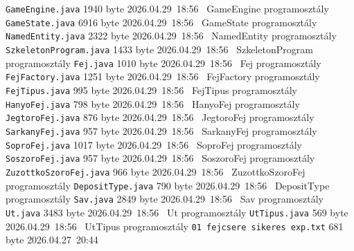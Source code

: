 \begin{fajllista}
    \fajl
    {\texttt{GameEngine.java}} %
    {1940 byte} %
    {2026.04.29~18:56~} %
    {GameEngine programosztály} %
    \fajl
    {\texttt{GameState.java}} %
    {6916 byte} %
    {2026.04.29~18:56~} %
    {GameState programosztály} %
    \fajl
    {\texttt{NamedEntity.java}} %
    {2322 byte} %
    {2026.04.29~18:56~} %
    {NamedEntity programosztály} %
    \fajl
    {\texttt{SzkeletonProgram.java}} %
    {1433 byte} %
    {2026.04.29~18:56~} %
    {SzkeletonProgram programosztály} %
    \fajl
    {\texttt{Fej.java}} %
    {1010 byte} %
    {2026.04.29~18:56~} %
    {Fej programosztály} %
    \fajl
    {\texttt{FejFactory.java}} %
    {1251 byte} %
    {2026.04.29~18:56~} %
    {FejFactory programosztály} %
    \fajl
    {\texttt{FejTipus.java}} %
    {995 byte} %
    {2026.04.29~18:56~} %
    {FejTipus programosztály} %
    \fajl
    {\texttt{HanyoFej.java}} %
    {798 byte} %
    {2026.04.29~18:56~} %
    {HanyoFej programosztály} %
    \fajl
    {\texttt{JegtoroFej.java}} %
    {876 byte} %
    {2026.04.29~18:56~} %
    {JegtoroFej programosztály} %
    \fajl
    {\texttt{SarkanyFej.java}} %
    {957 byte} %
    {2026.04.29~18:56~} %
    {SarkanyFej programosztály} %
    \fajl
    {\texttt{SoproFej.java}} %
    {1017 byte} %
    {2026.04.29~18:56~} %
    {SoproFej programosztály} %
    \fajl
    {\texttt{SoszoroFej.java}} %
    {957 byte} %
    {2026.04.29~18:56~} %
    {SoszoroFej programosztály} %
    \fajl
    {\texttt{ZuzottkoSzoroFej.java}} %
    {966 byte} %
    {2026.04.29~18:56~} %
    {ZuzottkoSzoroFej programosztály} %
    \fajl
    {\texttt{DepositType.java}} %
    {790 byte} %
    {2026.04.29~18:56~} %
    {DepositType programosztály} %
    \fajl
    {\texttt{Sav.java}} %
    {2849 byte} %
    {2026.04.29~18:56~} %
    {Sav programosztály} %
    \fajl
    {\texttt{Ut.java}} %
    {3483 byte} %
    {2026.04.29~18:56~} %
    {Ut programosztály} %
    \fajl
    {\texttt{UtTipus.java}} %
    {569 byte} %
    {2026.04.29~18:56~} %
    {UtTipus programosztály} %
    \fajl
    {\texttt{01 fejcsere sikeres exp.txt}} %
    {681 byte} %
    {2026.04.27~20:44~} %

\end{fajllista}

